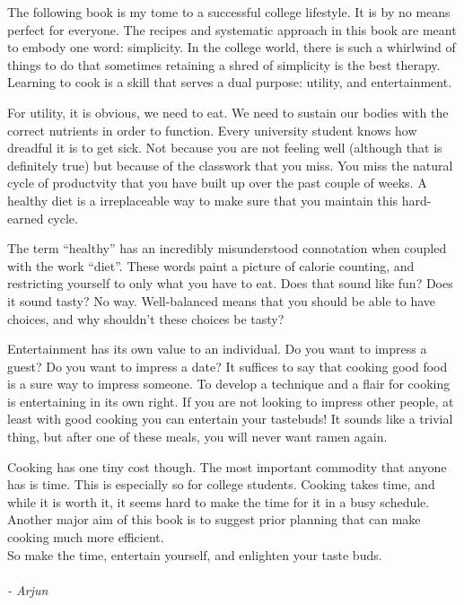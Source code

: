 

The following book is my tome to a successful college lifestyle. It is by no means perfect for everyone. The recipes and systematic approach in this book are meant to embody one word: simplicity. In the college world, there is such a whirlwind of things to do that sometimes retaining a shred of simplicity is the best therapy. Learning to cook is a skill that serves a dual purpose: utility, and entertainment. 

For utility, it is obvious, we need to eat. We need to sustain our bodies with the correct nutrients in order to function. Every university student knows how dreadful it is to get sick. Not because you are not feeling well (although that is definitely true) but because of the classwork that you miss. You miss the natural cycle of productvity that you have built up over the past couple of weeks. A healthy diet is a irreplaceable way to make sure that you maintain this hard-earned cycle. 

The term ``healthy'' has an incredibly misunderstood connotation when coupled with the work ``diet''. These words paint a picture of calorie counting, and restricting yourself to only what you have to eat. Does that sound like fun? Does it sound tasty? No way. Well-balanced means that you should be able to have choices, and why shouldn't these choices be tasty? 

Entertainment has its own value to an individual. Do you want to impress a guest? Do you want to impress a date? It suffices to say that cooking good food is a sure way to impress someone. To develop a technique and a flair for cooking is entertaining in its own right. If you are not looking to impress other people, at least with good cooking you can entertain your tastebuds! It sounds like a trivial thing, but after one of these meals, you will never want ramen again. 

Cooking has one tiny cost though. The most important commodity that anyone has is time. This is especially so for college students. Cooking takes time, and while it is worth it, it seems hard to make the time for it in a busy schedule. Another major aim of this book is to suggest prior planning that can make cooking much more efficient.\\
So make the time, entertain yourself, and enlighten your taste buds.
\\\\
\textit{- Arjun} 


